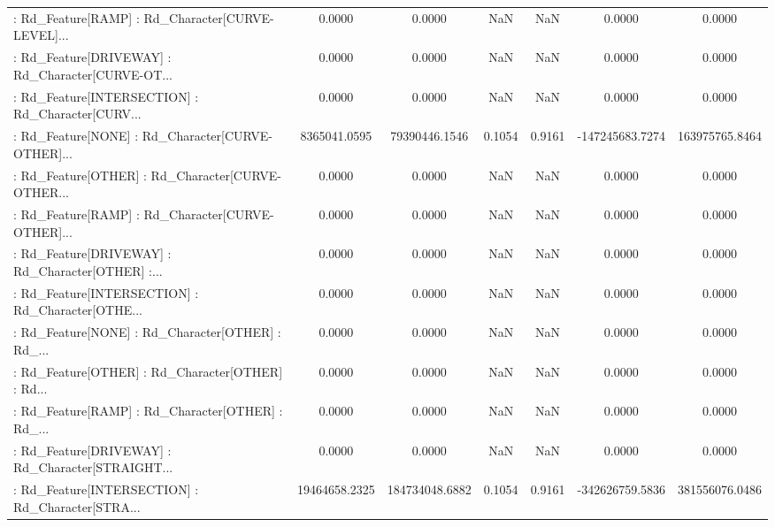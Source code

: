 \begin{longtable}{p{4cm}cccccc}
 : Rd\_Feature[RAMP] : Rd\_Character[CURVE-LEVEL]... &            0.0000 &            0.0000 &     NaN &          NaN &             0.0000 &            0.0000 \\
 : Rd\_Feature[DRIVEWAY] : Rd\_Character[CURVE-OT... &            0.0000 &            0.0000 &     NaN &          NaN &             0.0000 &            0.0000 \\
 : Rd\_Feature[INTERSECTION] : Rd\_Character[CURV... &            0.0000 &            0.0000 &     NaN &          NaN &             0.0000 &            0.0000 \\
 : Rd\_Feature[NONE] : Rd\_Character[CURVE-OTHER]... &      8365041.0595 &     79390446.1546 &  0.1054 &       0.9161 &    -147245683.7274 &    163975765.8464 \\
 : Rd\_Feature[OTHER] : Rd\_Character[CURVE-OTHER... &            0.0000 &            0.0000 &     NaN &          NaN &             0.0000 &            0.0000 \\
 : Rd\_Feature[RAMP] : Rd\_Character[CURVE-OTHER]... &            0.0000 &            0.0000 &     NaN &          NaN &             0.0000 &            0.0000 \\
 : Rd\_Feature[DRIVEWAY] : Rd\_Character[OTHER] :... &            0.0000 &            0.0000 &     NaN &          NaN &             0.0000 &            0.0000 \\
 : Rd\_Feature[INTERSECTION] : Rd\_Character[OTHE... &            0.0000 &            0.0000 &     NaN &          NaN &             0.0000 &            0.0000 \\
 : Rd\_Feature[NONE] : Rd\_Character[OTHER] : Rd\_... &            0.0000 &            0.0000 &     NaN &          NaN &             0.0000 &            0.0000 \\
 : Rd\_Feature[OTHER] : Rd\_Character[OTHER] : Rd... &            0.0000 &            0.0000 &     NaN &          NaN &             0.0000 &            0.0000 \\
 : Rd\_Feature[RAMP] : Rd\_Character[OTHER] : Rd\_... &            0.0000 &            0.0000 &     NaN &          NaN &             0.0000 &            0.0000 \\
 : Rd\_Feature[DRIVEWAY] : Rd\_Character[STRAIGHT... &            0.0000 &            0.0000 &     NaN &          NaN &             0.0000 &            0.0000 \\
 : Rd\_Feature[INTERSECTION] : Rd\_Character[STRA... &     19464658.2325 &    184734048.6882 &  0.1054 &       0.9161 &    -342626759.5836 &    381556076.0486 \\

\end{longtable}
